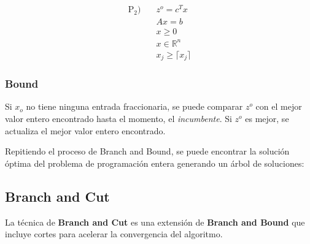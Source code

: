 \documentclass{article}
\begin{document}
\begin{align*}
    \text{P}_2) \quad & z^o = c^T x                \\
                      & Ax = b                     \\
                      & x \geq 0                   \\
                      & x \in \mathbb{R}^n         \\
                      & x_j \geq \lceil x_j \rceil
\end{align*}

\subsubsection{Bound}

Si $x_o$ no tiene ninguna entrada fraccionaria, se puede comparar $z^o$ con el mejor valor entero encontrado hasta el momento, el \textit{incumbente}. Si $z^o$ es mejor, se actualiza el mejor valor entero encontrado.

Repitiendo el proceso de Branch and Bound, se puede encontrar la solución óptima del problema de programación entera generando un árbol de soluciones:

\begin{center}
\end{center}

\subsection{Branch and Cut}

La técnica de \textbf{Branch and Cut} es una extensión de \textbf{Branch and Bound} que incluye cortes para acelerar la convergencia del algoritmo.
\end{document}
